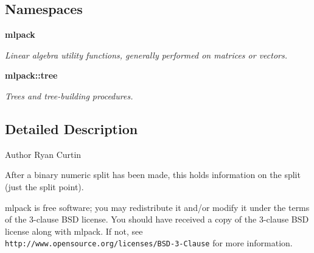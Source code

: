 \subsection*{Namespaces}
\begin{DoxyCompactItemize}
\item 
 {\bf mlpack}
\begin{DoxyCompactList}\small\item\em Linear algebra utility functions, generally performed on matrices or vectors. \end{DoxyCompactList}\item 
 {\bf mlpack\+::tree}
\begin{DoxyCompactList}\small\item\em Trees and tree-\/building procedures. \end{DoxyCompactList}\end{DoxyCompactItemize}


\subsection{Detailed Description}
\begin{DoxyAuthor}{Author}
Ryan Curtin
\end{DoxyAuthor}
After a binary numeric split has been made, this holds information on the split (just the split point).

mlpack is free software; you may redistribute it and/or modify it under the terms of the 3-\/clause B\+SD license. You should have received a copy of the 3-\/clause B\+SD license along with mlpack. If not, see {\tt http\+://www.\+opensource.\+org/licenses/\+B\+S\+D-\/3-\/\+Clause} for more information. 